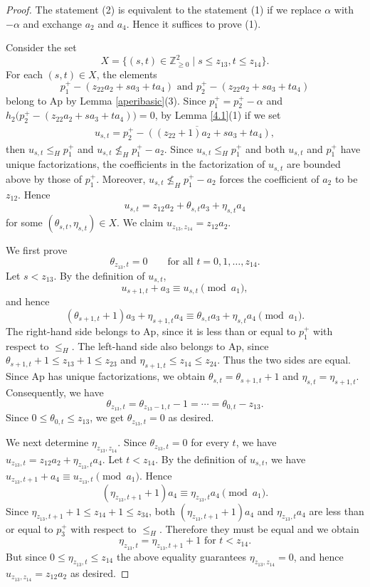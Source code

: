 \documentclass[12pt]{amsart}
\numberwithin{equation}{section}
\theoremstyle{definition}
\newcommand{\Ap}{\mathrm{Ap}}
\begin{document}
\begin{proof}
The statement (2) is equivalent to the statement (1) if we replace $\alpha$ with $-\alpha$ and exchange $a_2$ and $a_4$.
Hence it suffices to prove (1).

Consider the set
\[X=\{(s,t) \in \mathbb Z^2_{\geq 0} \mid s \leq z_{13},t \leq z_{14}\}.
\]
For each $(s,t) \in X$, the elements
\[p^+_1-(z_{22}a_2+sa_3+ta_4) \text{ and }
p^+_2-(z_{22}a_2+sa_3+ta_4)
\]
belong to $\Ap$ by Lemma \ref{aperibasic}(3).
Since $p^+_1=p^+_2-\alpha$ and $h_2\big(p^+_2-(z_{22}a_2+sa_3+ta_4)\big)=0$,
by Lemma \ref{4.1}(1) if we set
\begin{align}
\label{ust}
u_{s,t}=\overline{p_2^+-((z_{22}+1)a_2+sa_3+ta_4)},
\end{align}
then
$u_{s,t} \leq _H p_1^+$ and $u_{s,t} \not \leq _H p_1^+-a_2$.
Since $u_{s,t}\leq_Hp_1^+$ and both $u_{s,t}$ and $p_1^+$
have unique factorizations, the coefficients in the factorization of
$u_{s,t}$ are bounded above by those of $p_1^+$.
Moreover, $u_{s,t}\not\leq_Hp_1^+-a_2$ forces the coefficient
of $a_2$ to be $z_{12}$.
Hence
\[
u_{s,t}=z_{12}a_2+\theta_{s,t} a_3 + \eta_{s,t} a_4
\]
for some  $(\theta_{s,t},\eta_{s,t}) \in X$.
We claim 
$u_{z_{13},z_{14}}=z_{12}a_2$.

We first prove
\[
\theta_{z_{13},t}=0
\qquad\text{for all } t=0,1,\dots,z_{14}.
\]
Let $s<z_{13}$. By the definition of $u_{s,t}$,
\[
u_{s+1,t}+a_3\equiv u_{s,t}\pmod{a_1},
\]
and hence
\[
(\theta_{s+1,t}+1)a_3+\eta_{s+1,t}a_4
\equiv
\theta_{s,t}a_3+\eta_{s,t}a_4
\pmod{a_1}.
\]
The right-hand side belongs to $\Ap$, since it is less than or equal
to $p_1^+$ with respect to $\leq_H$. The left-hand side also belongs
to $\Ap$, since
$\theta_{s+1,t}+1\leq z_{13}+1\leq z_{23}$
and
$\eta_{s+1,t}\leq z_{14}\leq z_{24}$.
Thus the two sides are equal. Since $\Ap$ has unique factorizations,
we obtain
$\theta_{s,t}=\theta_{s+1,t}+1$ and 
$\eta_{s,t}=\eta_{s+1,t}$.
Consequently, we have
\[
\theta_{z_{13},t}=\theta_{z_{13}-1,t}-1
=\cdots =\theta_{0,t}-z_{13}.
\]
Since $0 \leq \theta_{0,t} \leq z_{13}$,
we get
$\theta_{z_{13},t}=0$ as desired.

We next determine $\eta_{z_{13},z_{14}}$.
Since $\theta_{z_{13},t}=0$ for every $t$, we have
$u_{z_{13},t}
=
z_{12}a_2+\eta_{z_{13},t}a_4.$
Let $t<z_{14}$. By the definition of $u_{s,t}$,
we have $u_{z_{13},t+1}+a_4
\equiv
u_{z_{13},t}
\pmod{a_1}$.
Hence
\[
(\eta_{z_{13},t+1}+1)a_4
\equiv
\eta_{z_{13},t}a_4
\pmod{a_1}.
\]
Since
$\eta_{z_{13},t+1}+1
\leq z_{14}+1
\leq z_{34}$,
both
$(\eta_{z_{13},t+1}+1)a_4$
and $\eta_{z_{13},t}a_4$
are less than or equal to $p^+_3$ with respect to $\leq_H$.
Therefore they must be equal and we obtain
\[
\eta_{z_{13},t}
=
\eta_{z_{13},t+1}+1 \text{ for }t <z_{14}.
\]
But since $0 \leq \eta_{z_{13},t}\leq z_{14}
$ the above equality guarantees
$\eta_{z_{13},z_{14}}=0$,
and hence
$u_{z_{13},z_{14}}=z_{12}a_2$
as desired.


\end{proof}
\end{document}
